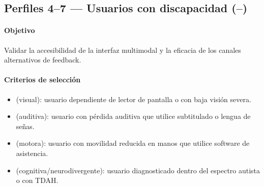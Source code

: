 \subsection{Perfiles 4--7 --- Usuarios con discapacidad (--)}

\paragraph{Objetivo} Validar la accesibilidad de la interfaz multimodal
y la eficacia de los canales alternativos de feedback.

\paragraph{Criterios de selección}
\begin{itemize}
  \item {} (visual): usuario dependiente de lector de pantalla o
        con baja visión severa.
  \item {} (auditiva): usuario con pérdida auditiva que utilice
        subtitulado o lengua de señas.
  \item {} (motora): usuario con movilidad reducida en manos que
        utilice software de asistencia.
  \item {} (cognitiva/neurodivergente): usuario diagnosticado
        dentro del espectro autista o con TDAH.
\end{itemize}

